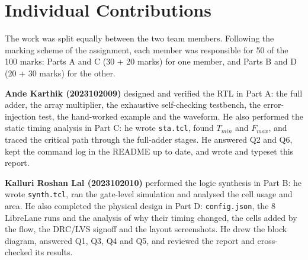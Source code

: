 \documentclass[10pt,a4paper,twocolumn]{article}
\begin{document}
\section{Individual Contributions}

The work was split equally between the two team members. Following the marking scheme of the assignment,
each member was responsible for 50 of the 100 marks: Parts A and C (30 + 20 marks) for one member, and
Parts B and D (20 + 30 marks) for the other.

\textbf{Ande Karthik (2023102009)} designed and verified the RTL in Part A: the full adder, the array
multiplier, the exhaustive self-checking testbench, the error-injection test, the hand-worked example and the
waveform. He also performed the static timing analysis in Part C: he wrote \texttt{sta.tcl}, found $T_{min}$
and $F_{max}$, and traced the critical path through the full-adder stages. He answered Q2 and Q6, kept the
command log in the README up to date, and wrote and typeset this report.

\textbf{Kalluri Roshan Lal (2023102010)} performed the logic synthesis in Part B: he wrote \texttt{synth.tcl},
ran the gate-level simulation and analysed the cell usage and area. He also completed the physical design in
Part D: \texttt{config.json}, the 8 LibreLane runs and the analysis of why their timing changed, the cells
added by the flow, the DRC/LVS signoff and the layout screenshots. He drew the block diagram, answered Q1, Q3,
Q4 and Q5, and reviewed the report and cross-checked its results.
\end{document}
